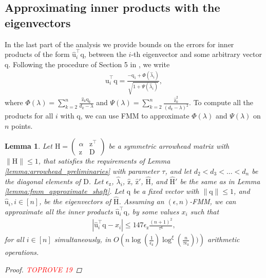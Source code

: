 \documentclass{article}
\newcommand{\lpar}{\left(}
\newcommand{\rpar}{\right)}
\newtheorem{lemma}{Lemma}[section]
\newcommand\vecq{\boldsymbol{\mathrm{q}}}
\newcommand\vecz{\boldsymbol{\mathrm{z}}}
\newcommand\vecuhat{\widehat{\boldsymbol{\mathrm{u}}}}
\newcommand\veczhat{\widehat{\boldsymbol{\mathrm{z}}}}
\newcommand\matD{\boldsymbol{\mathrm{D}}}
\newcommand\matH{\boldsymbol{\mathrm{H}}}
\newcommand\matHhat{\widehat{\boldsymbol{\mathrm{H}}}}
\newcommand{\cfmm}{\xi}
\newcommand{\fmmalgo}{FMM} \usepackage[utf8]{inputenc}
\begin{document}
\subsection{Approximating inner products with the eigenvectors}
In the last part of the analysis we provide bounds on the errors for inner products of the form $\vecuhat^\top_i\vecq$, between the $i$-th eigenvector and some arbitrary vector $\vecq$. Following the procedure of Section 5 in \cite{gu1995divide}, we write
\begin{align*}
    \vecuhat^\top_i\vecq = \frac{-\vecq_1+\Phi(\widehat\lambda_i)}{\sqrt{1+\Psi(\widehat\lambda_i)}},
\end{align*}
where $\Phi(\lambda)=\sum_{k=2}^n\frac{\veczhat_k\vecq_k}{d_k-\lambda}$ and 
$\Psi(\lambda)=
    \sum_{k=2}^n
        \frac{\veczhat_k^2}{(d_k-\lambda)^2}.
$
To compute all the products for all $i$ with $\vecq$, we can use FMM to approximate $\Phi(\lambda)$ and $\Psi(\lambda)$ on $n$ points. 


\begin{lemma}
    \label{lemma:fmm_approximate_inner_products}
        Let $\matH=\begin{pmatrix}
            \alpha & \vecz^\top\\
            \vecz & \matD
        \end{pmatrix}
        $
        be a symmetric arrowhead matrix with $\|\matH\|\leq 1$, that satisfies the requirements of Lemma \ref{lemma:arrowhead_preliminaries} with parameter $\tau$, and let $d_2 < d_3 < \ldots < d_n$ be the diagonal elements of  $\matD$. Let $\epsilon_{\vecz}$, $\widehat\lambda_i$, $\veczhat$, $\veczhat'$, $\matHhat$, and $\matHhat'$ be the same as in Lemma \ref{lemma:fmm_approximate_shaft}. 
        Let $\vecq$ be a fixed vector with $\|\vecq\|\leq 1$, and $\vecuhat_i, i\in[n]$, be the eigenvectors of $\matHhat$.
        Assuming an $(\epsilon,n)$-\fmmalgo, we can approximate all the inner products 
        $\vecuhat_i^\top\vecq$,  by some values $x_i$ such that 
        \begin{align*}
            |\vecuhat_i^\top\vecq - x_i| \leq 147\epsilon_{\vecz}
                \tfrac{(n+1)^2}{\tau^6},
        \end{align*}
        for all $i\in[n]$ simultaneously, in $O\lpar
            n\log(\tfrac{1}{\epsilon_{\vecz}})
            \log^{\cfmm}(\tfrac{n}{\tau\epsilon_{\vecz}}))
        \rpar$ arithmetic operations.
    \begin{proof}\textcolor{red}{TOPROVE 19}\end{proof}
\end{lemma}
\end{document}
